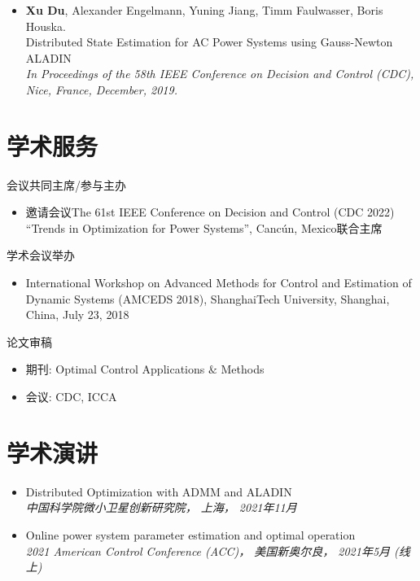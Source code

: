 \documentclass[paper=a4,fontsize=11pt]{scrartcl} %
\newcommand{\NewPart}[1]{\section*{\uppercase{#1}}}
\newcommand{\EducationEntry}[4]{
		\noindent \textbf{#1} \hfill      %
		\colorbox{White}{%
			\parbox{5cm}{%
			\hfill\color{Black}#2}} \par  %
		\noindent \textit{#3} \par        %
		\noindent\hangindent=2em\hangafter=0 \small #4 %
		\normalsize \par}
\begin{document}
\begin{CJK*}{UTF8}{gbsn}
\begin{itemize}
	\item  {\textbf{Xu Du}, Alexander Engelmann, Yuning Jiang, Timm Faulwasser, Boris Houska. \\
		Distributed State Estimation for AC Power Systems using Gauss-Newton ALADIN \\
		 \emph{In Proceedings of the 58th IEEE Conference on Decision and Control (CDC),
		Nice, France, December, 2019.} }
\end{itemize}

\NewPart{学术服务}{会议共同主席/参与主办}
%
\begin{itemize}
	\item{邀请会议The 61st
		IEEE Conference on Decision and Control (CDC 2022)
		“Trends in Optimization for Power Systems”, Canc\'un, Mexico联合主席}
	\end{itemize}
{学术会议举办}
\begin{itemize}
\item{International Workshop on Advanced Methods for Control and Estimation of Dynamic
	Systems (AMCEDS 2018), ShanghaiTech University, Shanghai, China, July 23, 2018}
\end{itemize}
{论文审稿}
\begin{itemize}
	\item 期刊: Optimal Control Applications $\&$ Methods
	\item 会议: CDC, ICCA
\end{itemize}

\NewPart{学术演讲}{}
\begin{itemize}
	\item  {
		{Distributed Optimization with ADMM and ALADIN}\\
		\emph{中国科学院微小卫星创新研究院， 上海， 2021年11月
	} }
	
	
	\item  {
		{Online power system parameter estimation and optimal operation}\\
		\emph{2021 American Control Conference (ACC)， 美国新奥尔良， 2021年5月 (线上)
	} }
	

\end{itemize}
\end{CJK*}
\end{document}
